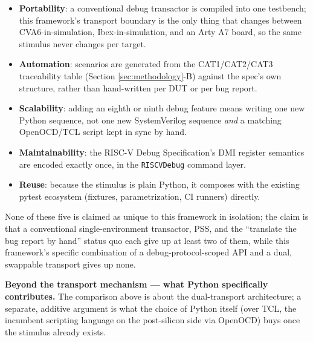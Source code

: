 \documentclass[conference]{IEEEtran}
\begin{document}
\begin{itemize}
\item \textbf{Portability}: a conventional debug transactor is compiled into one testbench; this framework's transport boundary is the only thing that changes between CVA6-in-simulation, Ibex-in-simulation, and an Arty A7 board, so the same stimulus never changes per target.
\item \textbf{Automation}: scenarios are generated from the CAT1/CAT2/CAT3 traceability table (Section \ref{sec:methodology}-B) against the spec's own structure, rather than hand-written per DUT or per bug report.
\item \textbf{Scalability}: adding an eighth or ninth debug feature means writing one new Python sequence, not one new SystemVerilog sequence \textit{and} a matching OpenOCD/TCL script kept in sync by hand.
\item \textbf{Maintainability}: the RISC-V Debug Specification's DMI register semantics are encoded exactly once, in the \texttt{RISCVDebug} command layer.
\item \textbf{Reuse}: because the stimulus is plain Python, it composes with the existing pytest ecosystem (fixtures, parametrization, CI runners) directly.
\end{itemize}

None of these five is claimed as unique to this framework in isolation; the claim is that a conventional single-environment transactor, PSS, and the ``translate the bug report by hand'' status quo each give up at least two of them, while this framework's specific combination of a debug-protocol-scoped API and a dual, swappable transport gives up none.

\textbf{Beyond the transport mechanism --- what Python specifically contributes.} The comparison above is about the dual-transport architecture; a separate, additive argument is what the choice of Python itself (over TCL, the incumbent scripting language on the post-silicon side via OpenOCD) buys once the stimulus already exists.
\end{document}
